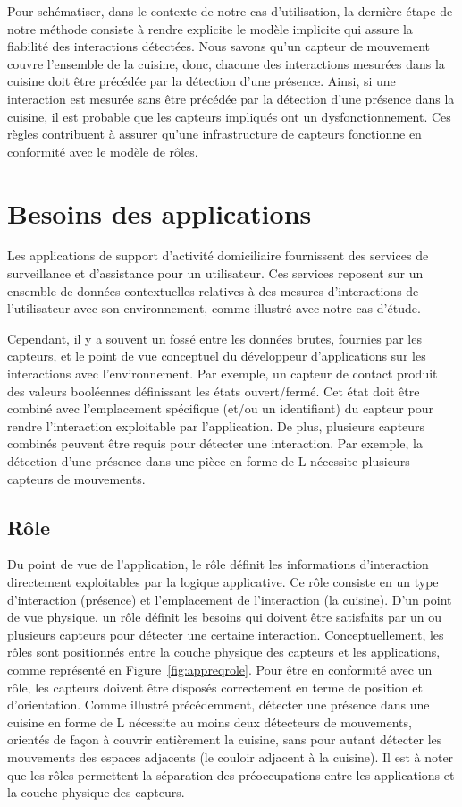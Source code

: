 Pour schématiser, dans le contexte de notre cas d'utilisation, la dernière 
étape de notre méthode consiste à rendre explicite le modèle implicite qui 
assure la fiabilité des interactions détectées. Nous savons qu'un capteur de
mouvement couvre l'ensemble de la cuisine, donc, chacune des 
interactions mesurées dans la cuisine doit être précédée par la détection 
d'une présence. 
Ainsi, si une interaction est mesurée sans être 
précédée par la détection d'une présence dans la cuisine, 
il est probable 
que les capteurs impliqués ont un dysfonctionnement. Ces règles contribuent 
à assurer qu'une infrastructure de capteurs fonctionne en conformité avec 
le modèle de rôles.

\section{Besoins des applications}\label{seq:fiabilite:besoinapp}
Les applications de support d'activité domiciliaire fournissent des services 
de surveillance et d'assistance pour un utilisateur. Ces services reposent sur 
un ensemble de données contextuelles relatives à des mesures d'interactions de 
l'utilisateur avec son environnement, comme illustré avec notre cas d'étude.

Cependant, il y a souvent un fossé entre les données brutes, fournies par les 
capteurs, et le point de vue conceptuel du développeur d'applications sur 
les interactions avec l'environnement. Par exemple, un capteur de contact produit des 
valeurs booléennes définissant les états ouvert/fermé. Cet état doit être 
combiné avec l'emplacement spécifique (et/ou un identifiant) du capteur pour 
rendre l'interaction exploitable par l'application. De plus, plusieurs capteurs 
combinés peuvent être requis pour détecter une interaction. Par exemple, la 
détection d'une présence dans une pièce en forme de L nécessite plusieurs 
capteurs de mouvements.

\subsection{Rôle}
Du point de vue de l'application, le rôle définit les informations d'interaction 
directement exploitables par la logique applicative. Ce rôle consiste en un type 
d'interaction (\eg présence) et l'emplacement de l'interaction (\eg la cuisine). 
D'un point de vue physique, un rôle définit les besoins qui doivent être 
satisfaits par un ou plusieurs capteurs pour détecter une certaine interaction. 
Conceptuellement, les rôles sont positionnés entre la couche physique des 
capteurs et les applications, comme représenté en Figure~\ref{fig:appreqrole}. 
Pour être en conformité avec un rôle, les capteurs doivent être disposés 
correctement en terme de position et d'orientation. 
Comme illustré précédemment, détecter une présence dans une cuisine en forme de L 
nécessite au moins deux détecteurs de mouvements, orientés de façon à couvrir 
entièrement la cuisine, sans pour autant détecter les mouvements des espaces 
adjacents (\eg le couloir adjacent à la cuisine). Il est à noter que les rôles 
permettent la séparation des préoccupations entre les applications et la couche 
physique des capteurs.

